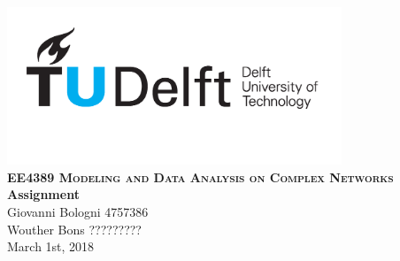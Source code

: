 \documentclass[a4paper, twoside,11pt]{article}
\begin{document}
\begin{titlepage}
\begin{center}
\includegraphics[width=10cm]{img/tu_logo.png}\\[4cm]
\textsc{\LARGE \bf EE4389 Modeling and Data Analysis on Complex Networks} \\[2cm]


{\Huge \bfseries Assignment} \\[6cm]

{\Large  Giovanni Bologni 4757386} \\
{\Large  Wouther Bons ?????????}\\[2cm]


{\normalsize  March 1st, 2018}

\end{center}
\end{titlepage}
\setcounter{page}{1}

\setcounter{page}{1}




%
%
\end{document}
